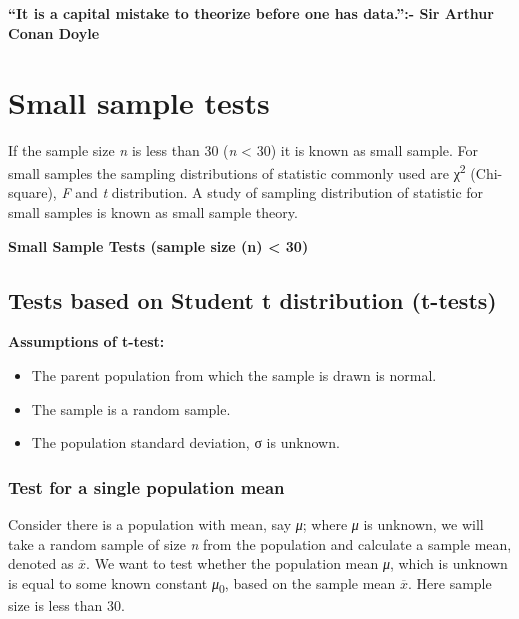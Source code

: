 \documentclass[
]{book}
\begin{document}
~\\
\hspace*{0.333em}\\
\hspace*{0.333em}

\hypertarget{hello}{}
\textbf{``It is a capital mistake to theorize before one has data.'':- Sir Arthur Conan Doyle}

\hypertarget{small-sample-tests}{%
\chapter{Small sample tests}\label{small-sample-tests}}

If the sample size \emph{n} is less than 30 (\emph{n} \textless{} 30) it is known as small sample. For small samples the sampling distributions of statistic commonly used are χ\textsuperscript{2} (Chi-square), \emph{F} and \emph{t} distribution. A study of sampling distribution of statistic for small samples is known as small sample theory.

\textbf{Small Sample Tests (sample size (n) \textless{} 30)}

\hypertarget{tests-based-on-student-t-distribution-t-tests}{%
\section{Tests based on Student t distribution (t-tests)}\label{tests-based-on-student-t-distribution-t-tests}}

\textbf{Assumptions of t-test:}

\begin{itemize}
\item
  The parent population from which the sample is drawn is normal.
\item
  The sample is a random sample.
\item
  The population standard deviation, σ is unknown.
\end{itemize}

\hypertarget{test-for-a-single-population-mean-1}{%
\subsection{Test for a single population mean}\label{test-for-a-single-population-mean-1}}

Consider there is a population with mean, say \emph{μ}; where \emph{μ} is unknown, we will take a random sample of size \emph{n} from the population and calculate a sample mean, denoted as \(\overline{x}\). We want to test whether the population mean \emph{μ}, which is unknown is equal to some known constant \emph{μ}\textsubscript{0}, based on the sample mean \(\overline{x}\). Here sample size is less than 30.
\end{document}
